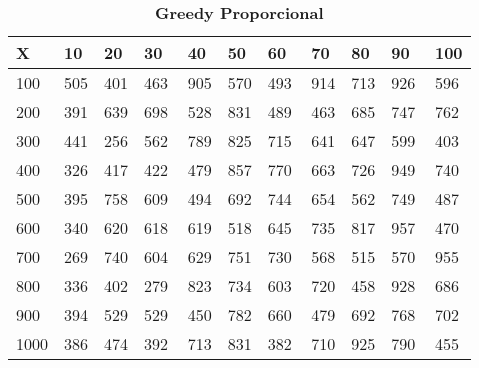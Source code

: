 \documentclass[10pt,letterpaper]{article}
\begin{document}
\begin{center}
\begin{table}\renewcommand{\arraystretch}{2.5}
\caption{\large \textbf{Greedy Proporcional}}
\centering
\begin{tabular} { |m{0.5cm}|m{1.3cm}|m{1.3cm}|m{1.3cm}|m{1.3cm}|m{1.3cm}|m{1.3cm}|m{1.3cm}|m{1.3cm}|m{1.3cm}|m{1.3cm}|} 
\hline
\rowcolor{Gray}
\centering \textbf{X} & \centering \textbf{10} & \centering \textbf{20} & \centering \textbf{30}\ & \centering \textbf{40} & \centering \textbf{50} & \centering \textbf{60}\ & \centering \textbf{70} & \centering \textbf{80} & \centering \textbf{90}\ & \textbf{100} \\\hline
\cellcolor{Gray}100 & \Large 505 & \Large 401 & \Large 463 & \Large 905 & \Large 570 & \Large 493 & \Large 914 & \Large 713 & \Large 926 & \Large 596 \\
\hline
\cellcolor{Gray}200 & \Large 391 & \Large 639 & \Large 698 & \Large 528 & \Large 831 & \Large 489 & \Large 463 & \Large 685 & \Large 747 & \Large 762 \\
\hline
\cellcolor{Gray}300 & \Large 441 & \Large 256 & \Large 562 & \Large 789 & \Large 825 & \Large 715 & \Large 641 & \Large 647 & \Large 599 & \Large 403 \\
\hline
\cellcolor{Gray}400 & \Large 326 & \Large 417 & \Large 422 & \Large 479 & \Large 857 & \Large 770 & \Large 663 & \Large 726 & \Large 949 & \Large 740 \\
\hline
\cellcolor{Gray}500 & \Large 395 & \Large 758 & \Large 609 & \Large 494 & \Large 692 & \Large 744 & \Large 654 & \Large 562 & \Large 749 & \Large 487 \\
\hline
\cellcolor{Gray}600 & \Large 340 & \Large 620 & \Large 618 & \Large 619 & \Large 518 & \Large 645 & \Large 735 & \Large 817 & \Large 957 & \Large 470 \\
\hline
\cellcolor{Gray}700 & \Large 269 & \Large 740 & \Large 604 & \Large 629 & \Large 751 & \Large 730 & \Large 568 & \Large 515 & \Large 570 & \Large 955 \\
\hline
\cellcolor{Gray}800 & \Large 336 & \Large 402 & \Large 279 & \Large 823 & \Large 734 & \Large 603 & \Large 720 & \Large 458 & \Large 928 & \Large 686 \\
\hline
\cellcolor{Gray}900 & \Large 394 & \Large 529 & \Large 529 & \Large 450 & \Large 782 & \Large 660 & \Large 479 & \Large 692 & \Large 768 & \Large 702 \\
\hline
\cellcolor{Gray}1000 & \Large 386 & \Large 474 & \Large 392 & \Large 713 & \Large 831 & \Large 382 & \Large 710 & \Large 925 & \Large 790 & \Large 455 \\
\hline
\end{tabular} \\
\end{table}
\end{center}
\end{document}
